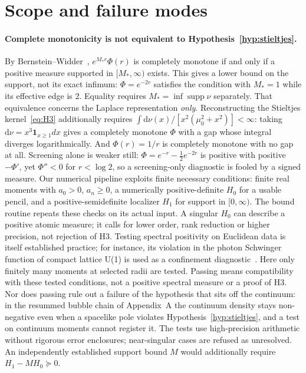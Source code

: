 \documentclass[11pt]{article}
\theoremstyle{definition}
\theoremstyle{remark}
\newcommand{\Mstar}{M_{*}}
\newcommand{\dnu}{\mathrm{d}\nu}
\DeclareMathOperator{\supp}{supp}
\begin{document}
\section{Scope and failure modes}
\label{sec:scope}

\paragraph{Complete monotonicity is not equivalent to
Hypothesis~\ref{hyp:stieltjes}.}
By Bernstein--Widder~\cite{widder1941laplace}, $e^{\Mstar r}\Phi(r)$ is
completely monotone if and only if a positive measure supported in
$[\Mstar,\infty)$ exists. This gives a lower bound on the support, not its
exact infimum: $\Phi=e^{-2r}$ satisfies the condition with $\Mstar=1$ while
its effective edge is $2$. Equality requires
$\Mstar=\inf\supp\nu$ separately. That equivalence concerns the Laplace
representation \emph{only}.
Reconstructing the Stieltjes kernel~\eqref{eq:H3} additionally requires
$\int\dnu(x)/[x^{2}(\mu_{0}^{2}+x^{2})]<\infty$: taking $\dnu=x^{3}
\mathbf{1}_{x\ge1}dx$ gives a completely monotone $\Phi$ with a gap whose
integral diverges logarithmically. And $\Phi(r)=1/r$ is completely monotone
with no gap at all. Screening alone is weaker still:
$\Phi=e^{-r}-\tfrac12e^{-2r}$ is positive with positive $-\Phi'$, yet
$\Phi''<0$ for $r<\log 2$, so a screening-only diagnostic is fooled by a signed
measure. Our numerical pipeline exploits finite necessary conditions: finite
real moments with $a_0>0$, $a_n\ge0$, a numerically positive-definite $H_0$
for a usable pencil, and a positive-semidefinite localizer $H_1$ for support
in $[0,\infty)$. The bound routine repeats these checks on its actual input.
A singular $H_0$ can describe a positive atomic measure; it calls for lower
order, rank reduction or higher precision, not rejection of H3.
Testing spectral positivity on Euclidean data is itself established practice;
for instance, its violation in the photon Schwinger function of compact
lattice U(1) is used as a confinement
diagnostic~\cite{loveridge_oliveira_silva_2022}. Here only finitely many moments
at selected radii are tested. Passing means compatibility with these tested
conditions, not a positive spectral measure or a proof of H3. Nor does passing
rule out a failure of the hypothesis that sits off the continuum: in the
resummed bubble chain of Appendix~A the continuum density stays non-negative
even when a spacelike pole violates Hypothesis~\ref{hyp:stieltjes}, and a test
on continuum moments cannot register it. The tests use
high-precision arithmetic without rigorous error enclosures; near-singular
cases are refused as unresolved. An independently established support bound
$M$ would additionally require $H_1-MH_0\succeq0$.
\end{document}
